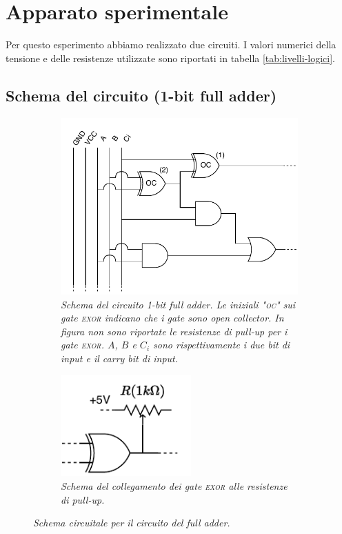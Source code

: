 \section{Apparato sperimentale}\label{sec:apparato-sperimentale}
Per questo esperimento abbiamo realizzato due circuiti.
I valori numerici della tensione e delle resistenze utilizzate sono riportati
in tabella \ref{tab:livelli-logici}.

\subsection{Schema del circuito (1-bit full adder)}\label{subsec:schema-circuito}
\begin{figure}[h]
  \begin{subfigure}[t]{.66\textwidth}
    \includegraphics[width=10cm]{../assets/1bfa.drawio.pdf}
    \caption{
      \emph{
        Schema del circuito 1-bit full adder. Le iniziali "\textsc{oc}" sui gate \textsc{exor} indicano che i gate sono
        \emph{open collector}. In figura non sono riportate le resistenze di pull-up per i gate
        \textsc{exor}. $A$, $B$ e $C_i$ sono rispettivamente i due bit di input e il carry bit di input.
      }
    }
    \label{fig:circuito}
  \end{subfigure}
  \hspace{5mm}
  \begin{subfigure}[t]{.25\textwidth}
    \includegraphics[width=5cm]{../assets/oc.drawio.pdf}
    \caption{
      \emph{
        Schema del collegamento dei gate \textsc{exor} alle resistenze di pull-up.
      }
    }
    \label{fig:exor-pullup}
  \end{subfigure}
  \caption{\emph{Schema circuitale per il circuito del full adder.}}
  \label{fig:circuiti}
\end{figure}

